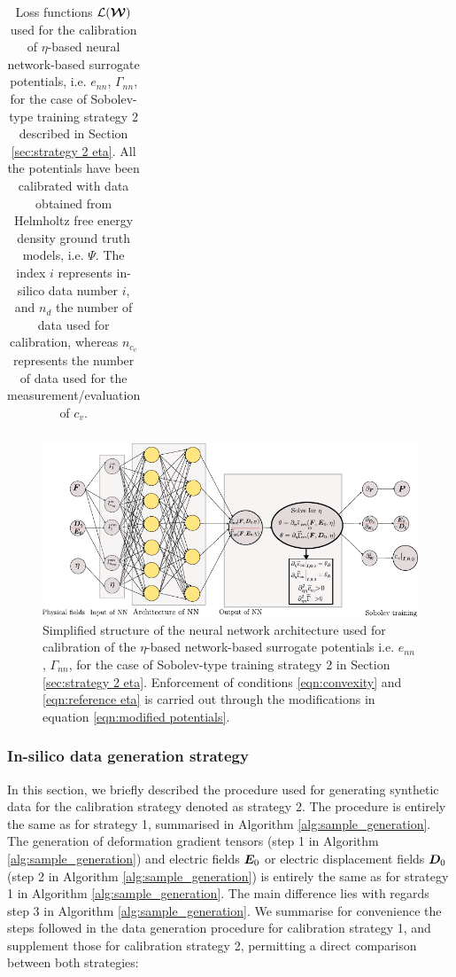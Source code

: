 \begin{table}[htbp!]
\begin{tabular}{c c c}
		
	\end{tabular}
	\caption{Loss functions $\mathcal{L}(\boldsymbol{\mathcal{W}})$ used for the calibration of $\eta$-based neural network-based surrogate potentials, i.e. $e_{nn}$,  $\Gamma_{nn}$, for the case of Sobolev-type training strategy 2 described in Section \ref{sec:strategy 2 eta}. All the potentials have been calibrated with data obtained from Helmholtz free energy density ground truth models, i.e. $\Psi$. The index $i$ represents in-silico data number $i$, and $n_d$ the number of data used for calibration, whereas $n_{c_v}$ represents the number of data used for the measurement/evaluation of $c_v$.}
	\label{table: sobolev type 2 eta}
\end{table}




\begin{figure}[htpb!]
	\centering
	\includegraphics[width=1.0\textwidth]{Figures/InkScape/NN_3}
	\vspace{-2mm}
	\caption{Simplified structure of the neural network architecture used for calibration of the $\eta$-based network-based surrogate potentials i.e. $e_{nn}$, $\Gamma_{nn}$, for the case of Sobolev-type training strategy 2 in Section \ref{sec:strategy 2 eta}. Enforcement of conditions \eqref{eqn:convexity} and \eqref{eqn:reference eta} is carried out through the modifications in equation \eqref{eqn:modified potentials}.}
	\label{fig:strategy 2 eta}
\end{figure}


\subsubsection{In-silico data generation strategy}

In this section, we briefly described the procedure used for generating synthetic data for the calibration strategy denoted as strategy 2. The procedure is entirely the same as for strategy 1, summarised in Algorithm \ref{alg:sample_generation}. The generation of deformation gradient tensors (step 1 in Algorithm \ref{alg:sample_generation}) and electric fields $\boldsymbol{E}_0$ or electric displacement fields $\boldsymbol{D}_0$ (step 2 in Algorithm \ref{alg:sample_generation}) is entirely the same as for strategy 1 in Algorithm \ref{alg:sample_generation}. The main difference lies with regards step 3 in Algorithm \ref{alg:sample_generation}. We summarise for convenience the steps followed in the data generation procedure for calibration strategy 1, and supplement those for calibration strategy 2, permitting a direct comparison between both strategies:

